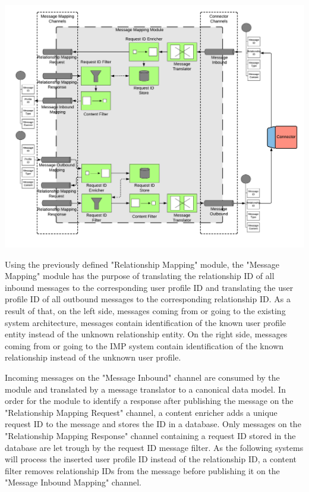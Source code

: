 \begin{center}
    \includegraphics[scale=0.6]{Diagrams/Integration Architecture 1/Technological Integration/10. Message Mapping Module.pdf}
\end{center}

Using the previously defined "Relationship Mapping" module, the "Message Mapping" module has the purpose of translating the relationship ID of all inbound messages to the corresponding user profile ID and translating the user profile ID of all outbound messages to the corresponding relationship ID. As a result of that, on the left side, messages coming from or going to the existing system architecture, messages contain identification of the known user profile entity instead of the unknown relationship entity. On the right side, messages coming from or going to the IMP system contain identification of the known relationship instead of the unknown user profile.

Incoming messages on the "Message Inbound" channel are consumed by the module and translated by a message translator to a canonical data model. In order for the module to identify a response after publishing the message on the "Relationship Mapping Request" channel, a content enricher adds a unique request ID to the message and stores the ID in a database. Only messages on the "Relationship Mapping Response" channel containing a request ID stored in the database are let trough by the request ID message filter. As the following systems will process the inserted user profile ID instead of the relationship ID, a content filter removes relationship IDs from the message before publishing it on the "Message Inbound Mapping" channel.

